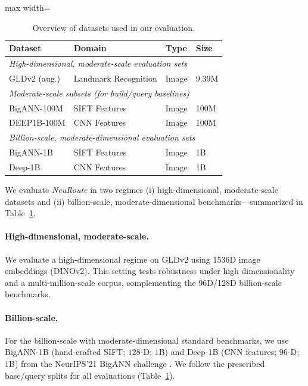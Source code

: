\documentclass[sigconf, nonacm]{acmart}
\begin{document}
\begin{table}[t]
\centering
\small
\caption{Overview of datasets used in our evaluation.}
\label{tab:datasets_all}
\begin{adjustbox}{max width=\linewidth}
\begin{tabular}{llll}
\toprule
\textbf{Dataset} & \textbf{Domain} & \textbf{Type} & \textbf{Size} \\
\midrule
\multicolumn{4}{l}{\emph{High-dimensional, moderate-scale evaluation sets}}\\
GLDv2 (aug.) \cite{ref38} & Landmark Recognition & Image & 9.39M \\
\midrule
\multicolumn{4}{l}{\emph{Moderate-scale subsets (for build/query baselines)}}\\
BigANN-100M \cite{bigann_readme} & SIFT Features & Image & 100M \\
DEEP1B-100M \cite{7780595} & CNN Features & Image & 100M \\
\midrule
\multicolumn{4}{l}{\emph{Billion-scale, moderate-dimensional evaluation sets}}\\
BigANN-1B \cite{bigann_readme} & SIFT Features & Image & 1B \\
Deep-1B \cite{7780595} & CNN Features & Image & 1B \\
\bottomrule
\end{tabular}
\end{adjustbox}
\end{table}

We evaluate \textit{NeuRoute} in two regimes (i) high-dimensional, moderate-scale datasets and (ii) billion-scale, moderate-dimensional benchmarks—summarized in Table~\ref{tab:datasets_all}.


\paragraph{High-dimensional, moderate-scale.}
We evaluate a high-dimensional regime on GLDv2 using 1536D image embeddings (DINOv2).
This setting tests robustness under high dimensionality and a multi-million-scale corpus, complementing the 96D/128D billion-scale benchmarks.

\paragraph{Billion-scale.}
For the billion-scale with moderate-dimensional standard benchmarks, we use BigANN-1B (hand-crafted SIFT; \(128\)-D; \(1\)B) and Deep-1B (CNN features; \(96\)-D; \(1\)B)  from the NeurIPS’21 BigANN challenge \cite{simhadri2022bigann,bigann_readme}. We follow the prescribed base/query splits for all evaluations (Table~\ref{tab:datasets_all}).
\end{document}

